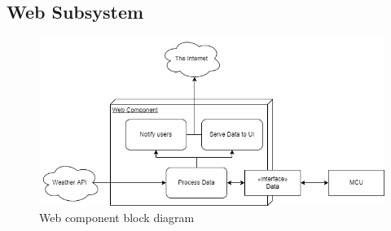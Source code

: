 \subsection{Web Subsystem}
\begin{figure}[H]
    \caption{Web component block diagram}
    \centering
    \includegraphics[width=\textwidth]{images/WebBlock.png}
\end{figure}